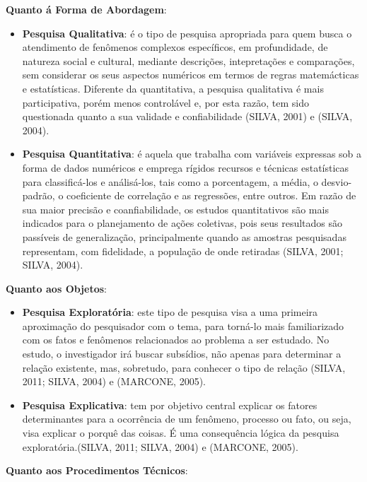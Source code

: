 \textbf{Quanto á Forma de Abordagem}: 

\begin{itemize}
\item \textbf{Pesquisa Qualitativa}: é o tipo de pesquisa apropriada para quem busca o atendimento de fenômenos complexos específicos, em profundidade, de natureza social e cultural, mediante descrições, intepretações e comparações, sem considerar os seus aspectos numéricos em termos de regras matemácticas e estatísticas. Diferente da quantitativa, a pesquisa qualitativa é mais participativa, porém menos controlável e, por esta razão, tem sido questionada quanto a sua validade e confiabilidade (SILVA, 2001) e (SILVA, 2004).
\item \textbf{Pesquisa Quantitativa}: é aquela que trabalha com variáveis expressas sob a forma de dados numéricos e emprega rígidos recursos e técnicas estatísticas para classificá-los e análisá-los, tais como a porcentagem, a média, o desvio-padrão, o coeficiente de correlação e as regressões, entre outros. Em razão de sua maior precisão e coanfiabilidade, os estudos quantitativos são mais indicados para o planejamento de ações coletivas, pois seus resultados são passíveis de generalização, principalmente quando as amostras pesquisadas representam, com fidelidade, a população de onde retiradas (SILVA, 2001; SILVA, 2004).
\end{itemize}


\textbf{Quanto aos Objetos}: 

\begin{itemize}
\item \textbf{Pesquisa Exploratória}: este tipo de pesquisa visa a uma primeira aproximação do pesquisador com o tema, para torná-lo mais familiarizado com os fatos e fenômenos relacionados ao problema a ser estudado. No estudo, o investigador irá buscar subsídios, não apenas para determinar a relação existente, mas, sobretudo, para conhecer o tipo de relação (SILVA, 2011; SILVA, 2004) e (MARCONE, 2005).
\item \textbf{Pesquisa Explicativa}: tem por objetivo central explicar os fatores determinantes para a ocorrência de um fenômeno, processo ou fato, ou seja, visa explicar o porquê das coisas. É uma consequência lógica da pesquisa exploratória.(SILVA, 2011; SILVA, 2004) e (MARCONE, 2005).
\end{itemize}


\textbf{Quanto aos Procedimentos Técnicos}: 

